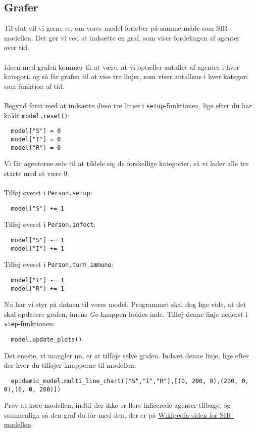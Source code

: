 \documentclass{article}
\begin{document}
\subsection{Grafer}
Til slut vil vi gerne se, om vores model forløber på samme måde som SIR-modellen. Det gør vi ved at indsætte en graf, som viser fordelingen af agenter over tid.\\\\
Ideen med grafen kommer til at være, at vi optæller antallet af agenter i hver kategori, og så får grafen til at vise tre linjer, som viser antallene i hver kategori som funktion af tid.\\\\
Begynd først med at indsætte disse tre linjer i \texttt{setup}-funktionen, lige efter du har kaldt \texttt{model.reset()}:
\begin{lstlisting}
  model["S"] = 0
  model["I"] = 0
  model["R"] = 0
\end{lstlisting}
Vi får agenterne selv til at tildele sig de forskellige kategorier, så vi lader alle tre starte med at være 0.\\\\
Tilføj øverst i \texttt{Person.setup}:
\begin{lstlisting}
  model["S"] += 1
\end{lstlisting}
Tilføj øverst i \texttt{Person.infect}:
\begin{lstlisting}
  model["S"] -= 1
  model["I"] += 1
\end{lstlisting}
Tilføj øverst i \texttt{Person.turn\_immune}:
\begin{lstlisting}
  model["I"] -= 1
  model["R"] += 1
\end{lstlisting}
Nu har vi styr på dataen til vores model. Programmet skal dog lige vide, at det skal opdatere grafen, imens \textit{Go}-knappen holdes inde. Tilføj denne linje nederst i \texttt{step}-funktionen:
\begin{lstlisting}
  model.update_plots()
\end{lstlisting}
Det eneste, vi mangler nu, er at tilføje selve grafen. Indsæt denne linje, lige efter der hvor du tilføjer knapperne til modellen:
\begin{lstlisting}
  epidemic_model.multi_line_chart(["S","I","R"],[(0, 200, 0),(200, 0, 0),(0, 0, 200)])
\end{lstlisting}
Prøv at køre modellen, indtil der ikke er flere inficerede agenter tilbage, og sammenlign så den graf du får med den, der er på \href{https://en.wikipedia.org/wiki/Compartmental_models_in_epidemiology#The_SIR_model}{Wikipedia-siden for SIR-modellen}.
\end{document}
